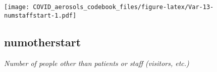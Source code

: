 \documentclass[]{article}
\begin{document}
\begin{minipage}{0.25 \textwidth}

\texttt{[image: COVID\_aerosols\_codebook\_files/figure-latex/Var-13-numstaffstart-1.pdf]}

\end{minipage}

\noindent\makebox[\linewidth]{\rule{\textwidth}{0.4pt}}

\hypertarget{numotherstart}{%
\subsection{numotherstart}\label{numotherstart}}

\emph{Number of people other than patients or staff (visitors, etc.)}

\begin{minipage}{0.75 \textwidth}


\end{minipage}
\end{document}
